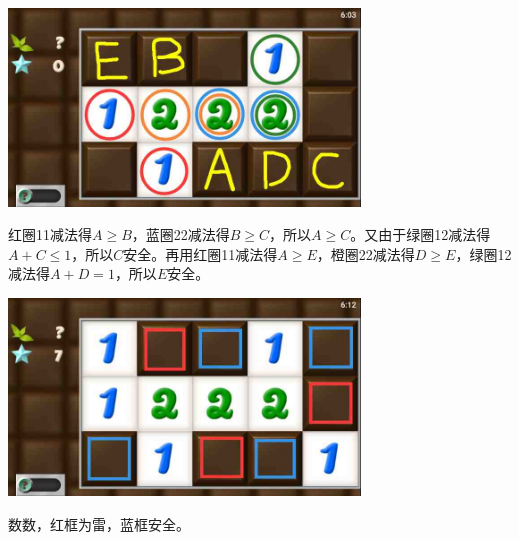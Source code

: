 \subsection{} %
\begin{center}
    \includegraphics[width=0.7\textwidth]{puzzlelow/67-1.jpg}
\end{center}
红圈11减法得$A\ge B$，蓝圈22减法得$B\ge C$，所以$A\ge C$。又由于绿圈12减法得$A+C\le 1$，所以$C$安全。再用红圈11减法得$A\ge E$，橙圈22减法得$D\ge E$，绿圈12减法得$A+D=1$，所以$E$安全。
\begin{center}
    \includegraphics[width=0.7\textwidth]{puzzlelow/67-2.jpg}
\end{center}
数数，红框为雷，蓝框安全。

